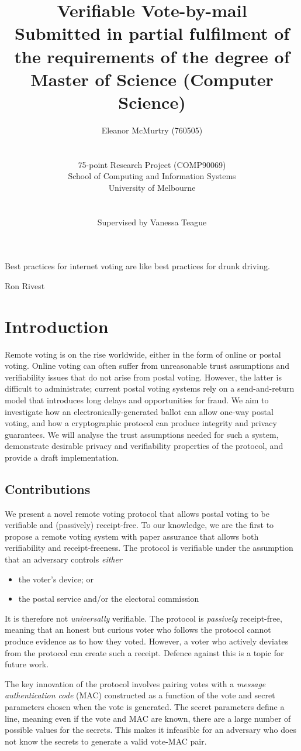 \documentclass[12pt,a4paper]{article}
\title{Verifiable Vote-by-mail\\\large Submitted in partial fulfilment of the requirements of the degree of\\Master of Science (Computer Science)}
\author{Eleanor McMurtry (760505)\\\\\\75-point Research Project (COMP90069)\\School of Computing and Information Systems\\University of Melbourne\\\\\\Supervised by Vanessa Teague}
\theoremstyle{definition}
\begin{document}
\maketitle
\newpage
\tableofcontents
\newpage
\epigraph{Best practices for internet voting are like best practices for drunk driving.}{Ron Rivest}
\section{Introduction}
Remote voting is on the rise worldwide, either in the form of online or postal voting. Online voting can often suffer from unreasonable trust assumptions and verifiability issues that do not arise from postal voting. However, the latter is difficult to administrate; current postal voting systems rely on a send-and-return model that introduces long delays and opportunities for fraud. We aim to investigate how an electronically-generated ballot can allow one-way postal voting, and how a cryptographic protocol can produce integrity and privacy guarantees. We will analyse the trust assumptions needed for such a system, demonstrate desirable privacy and verifiability properties of the protocol, and provide a draft implementation.

\subsection{Contributions}
We present a novel remote voting protocol that allows postal voting to be verifiable and (passively) receipt-free. To our knowledge, we are the first to propose a remote voting system with paper assurance that allows both verifiability and receipt-freeness. The protocol is verifiable under the assumption that an adversary controls \textit{either}
\begin{itemize}
    \item the voter's device; or
    \item the postal service and/or the electoral commission
\end{itemize}
It is therefore not \textit{universally} verifiable. The protocol is \textit{passively} receipt-free, meaning that an honest but curious voter who follows the protocol cannot produce evidence as to how they voted. However, a voter who actively deviates from the protocol can create such a receipt. Defence against this is a topic for future work.

The key innovation of the protocol involves pairing votes with a \textit{message authentication code} (MAC) constructed as a function of the vote and secret parameters chosen when the vote is generated. The secret parameters define a line, meaning even if the vote and MAC are known, there are a large number of possible values for the secrets. This makes it infeasible for an adversary who does not know the secrets to generate a valid vote-MAC pair.
\end{document}
